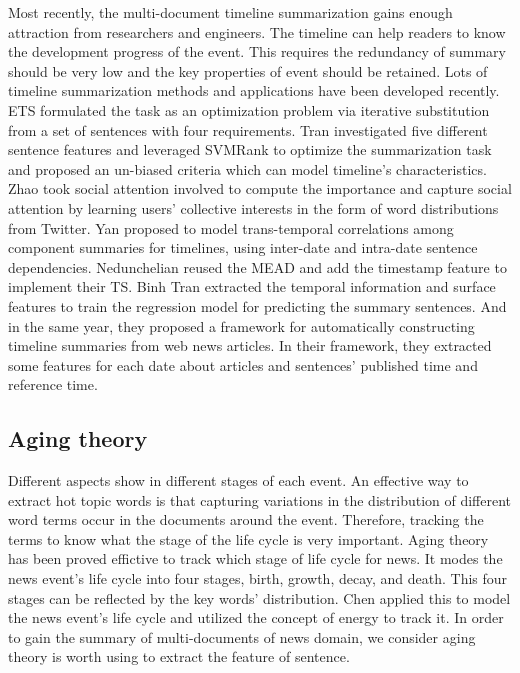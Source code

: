 \documentclass{acm_proc_article-sp}
\begin{document}
Most recently, the multi-document timeline summarization gains enough attraction from researchers and engineers.
The timeline can help readers to know the development  progress of the event.
This requires the redundancy of summary should be very low and the key properties of event should be retained. 
Lots of timeline summarization methods and applications have been developed recently. 
ETS\cite{2011-Yan-p745-754} formulated the task as an optimization  problem via iterative substitution from a set of sentences with four requirements. 
Tran\cite{tran2013leveraging} investigated five different sentence features and leveraged SVMRank to optimize the summarization task and proposed an un-biased criteria which can model timeline's characteristics.
Zhao\cite{zhao2013timeline} took social attention involved to compute the importance and capture social attention by learning users' collective interests in the form of word distributions from Twitter.
Yan\cite{Yan-2011-TGT-2145432-2145483} proposed to model trans-temporal correlations among component summaries for timelines, using inter-date and intra-date sentence dependencies.
Nedunchelian\cite{2008-Nedunchelian-p480-485} reused the MEAD and add the timestamp feature to implement their TS.
Binh Tran\cite{binh2013structured} extracted the temporal information and surface features to train the regression model for predicting the summary sentences. 
And in the same year, they\cite{binh2013predicting} proposed a framework for automatically constructing timeline summaries from web news articles. In their framework, they extracted some features for each date about articles and sentences' published time and reference time.

\subsection{Aging theory}

Different aspects show in different stages of each event.
An effective way to extract hot topic words is that capturing variations  in the distribution of different word terms occur in the documents around the event.
Therefore, tracking the terms to know what the stage of the life cycle is very important.
Aging theory has been proved effictive to track which stage of life cycle for news. 
It modes the news event's life cycle into four stages, birth, growth, decay, and death.
This four stages can be reflected by the key words' distribution.
Chen\cite{2007-Chen-p1016-1025}\cite{chen2003life} applied this to model the news event's life cycle and utilized the concept of energy to track it. 
In order to gain the summary of multi-documents of news domain, we consider aging theory is worth using to extract the feature of sentence.
\end{document}
